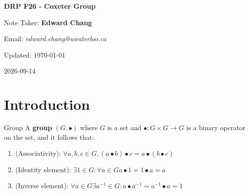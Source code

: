 \documentclass[11pt]{article}
\numberwithin{equation}{section}
\begin{document}
\begin{titlepage}
  \begin{center}
    \vspace*{4cm}
    \textbf{\Huge{DRP F26 - Coxeter Group}}
 
    \vspace{1.5cm}
    Note Taker: \textbf{Edward Chang}

    Email: \textit{edward.chang@uwaterloo.ca}

    Updated: \today
  \end{center}
\end{titlepage}

\tableofcontents
\newpage
2026-09-14
\section{Introduction}
\begin{defm}{Group}
  A \textbf{group} \((G, \bullet)\) where \(G\) is a set and \(\bullet: G \times G \to G\) is a binary operator on the set, and it follows that:
  \begin{enumerate}[label=\roman*)]
    \item (Associativity): \(\forall a, b, c \in G, (a \bullet b) \bullet c = a \bullet (b \bullet c)\)
    \item (Identity element): \(\exists 1 \in G: \forall a \in G a \bullet 1 = 1 \bullet a = a\)
    \item (Inverse element): \(\forall a \in G \exists a ^{-1} \in G: a \bullet a ^{-1} = a ^{-1} \bullet a = 1\)
  \end{enumerate}
\end{defm}
\end{document}
